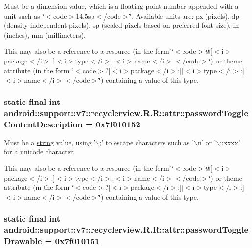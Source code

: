 Must be a dimension value, which is a floating point number appended with a unit such as \char`\"{}$<$code$>$14.5sp$<$/code$>$\char`\"{}. Available units are: px (pixels), dp (density-independent pixels), sp (scaled pixels based on preferred font size), in (inches), mm (millimeters). 

This may also be a reference to a resource (in the form \char`\"{}$<$code$>$@\mbox{[}$<$i$>$package$<$/i$>$:\mbox{]}$<$i$>$type$<$/i$>$:$<$i$>$name$<$/i$>$$<$/code$>$\char`\"{}) or theme attribute (in the form \char`\"{}$<$code$>$?\mbox{[}$<$i$>$package$<$/i$>$:\mbox{]}\mbox{[}$<$i$>$type$<$/i$>$:\mbox{]}$<$i$>$name$<$/i$>$$<$/code$>$\char`\"{}) containing a value of this type. \hypertarget{classandroid_1_1support_1_1v7_1_1recyclerview_1_1_r_1_1attr_2603cd7174ed845ac9997c731ce28a66}{
\subsubsection[{passwordToggleContentDescription}]{\setlength{\rightskip}{0pt plus 5cm}static final int android::support::v7::recyclerview.R.R::attr::passwordToggleContentDescription = 0x7f010152}}
\label{classandroid_1_1support_1_1v7_1_1recyclerview_1_1_r_1_1attr_2603cd7174ed845ac9997c731ce28a66}


Must be a \hyperlink{classandroid_1_1support_1_1v7_1_1recyclerview_1_1_r_1_1string}{string} value, using '$\backslash$;' to escape characters such as '$\backslash$n' or '$\backslash$uxxxx' for a unicode character. 

This may also be a reference to a resource (in the form \char`\"{}$<$code$>$@\mbox{[}$<$i$>$package$<$/i$>$:\mbox{]}$<$i$>$type$<$/i$>$:$<$i$>$name$<$/i$>$$<$/code$>$\char`\"{}) or theme attribute (in the form \char`\"{}$<$code$>$?\mbox{[}$<$i$>$package$<$/i$>$:\mbox{]}\mbox{[}$<$i$>$type$<$/i$>$:\mbox{]}$<$i$>$name$<$/i$>$$<$/code$>$\char`\"{}) containing a value of this type. \hypertarget{classandroid_1_1support_1_1v7_1_1recyclerview_1_1_r_1_1attr_b7674a7bf749c697389052af83f14500}{
\subsubsection[{passwordToggleDrawable}]{\setlength{\rightskip}{0pt plus 5cm}static final int android::support::v7::recyclerview.R.R::attr::passwordToggleDrawable = 0x7f010151}}
\label{classandroid_1_1support_1_1v7_1_1recyclerview_1_1_r_1_1attr_b7674a7bf749c697389052af83f14500}


